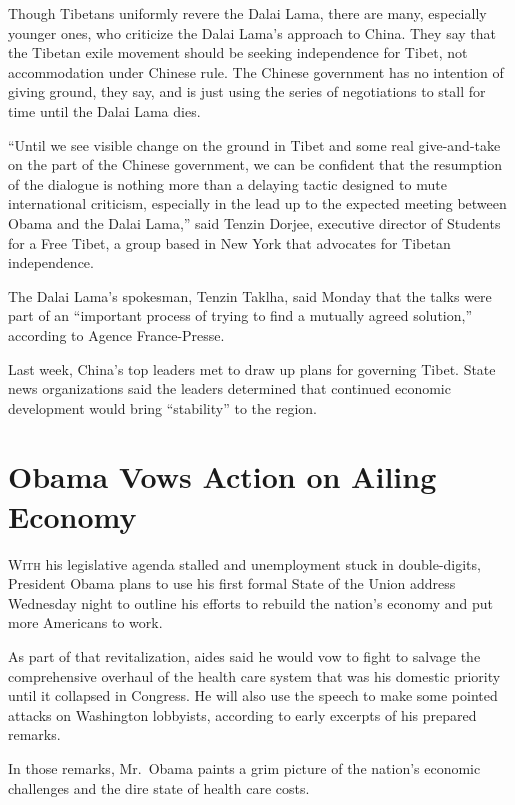 ﻿\documentclass[12pt]{article}
\begin{document}
Though Tibetans uniformly revere the Dalai Lama, there are many, especially younger ones, who
criticize the Dalai Lama's approach to China. They say that the Tibetan exile movement should be
seeking independence for Tibet, not accommodation under Chinese rule. The Chinese government has no
intention of giving ground, they say, and is just using the series of negotiations to stall for time
until the Dalai Lama dies.

``Until we see visible change on the ground in Tibet and some real give-and-take on the part of the
Chinese government, we can be confident that the resumption of the dialogue is nothing more than a
delaying tactic designed to mute international criticism, especially in the lead up to the expected
meeting between Obama and the Dalai Lama,'' said Tenzin Dorjee, executive director of Students for a
Free Tibet, a group based in New York that advocates for Tibetan independence.

The Dalai Lama's spokesman, Tenzin Taklha, said Monday that the talks were part of an ``important
process of trying to find a mutually agreed solution,'' according to Agence France-Presse.

Last week, China's top leaders met to draw up plans for governing Tibet. State news organizations
said the leaders determined that continued economic development would bring ``stability'' to the
region.

\section{Obama Vows Action on Ailing Economy}

\lettrine{W}{ith} his legislative agenda stalled and unemployment stuck in
double-digits, President Obama plans to use his first formal State of the Union address Wednesday
night to outline his efforts to rebuild the nation's economy and put more Americans to work.


As part of that revitalization, aides said he would vow to fight to salvage the comprehensive
overhaul of the health care system that was his domestic priority until it collapsed in Congress. He
will also use the speech to make some pointed attacks on Washington lobbyists, according to early
excerpts of his prepared remarks.

In those remarks, Mr.~Obama paints a grim picture of the nation's economic challenges and the dire
state of health care costs.
\end{document}
